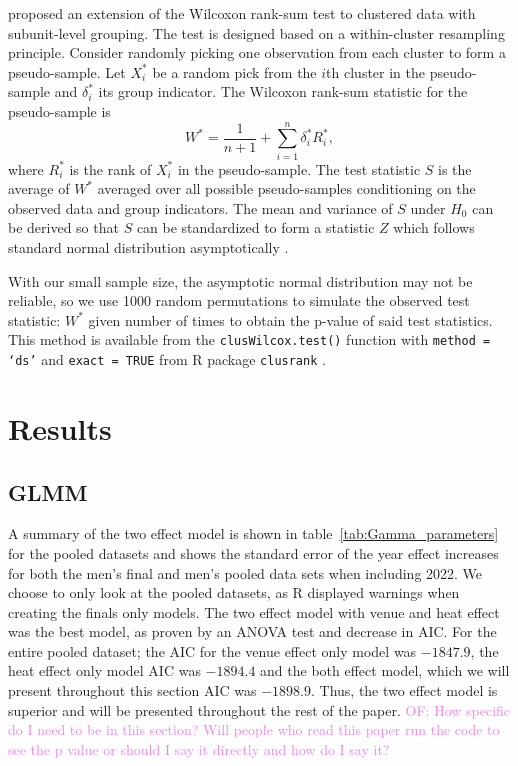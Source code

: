 \documentclass[12pt, letterpaper, titlepage]{article}
\newcommand{\of}[1]{\textcolor{violet}{OF: #1}}
\begin{document}
\citet{datta2005rank} proposed an extension of the Wilcoxon rank-sum test to
clustered data with subunit-level grouping. The test is designed based on a
within-cluster resampling principle. Consider randomly picking one observation
from each cluster to form a pseudo-sample. Let $X_i^*$ be a random pick from the
$i$th cluster in the pseudo-sample and $\delta_i^*$ its group indicator. The
Wilcoxon rank-sum statistic for the pseudo-sample is
\[
W^* = \frac{1}{n + 1} + \sum_{i=1}^{n} \delta_{i}^{*} R_{i}^{*},
\]
where $R_{i}^{*}$ is the rank of $X_{i}^{*}$ in the pseudo-sample.
The test statistic $S$ is the average of $W^*$ averaged over all possible
pseudo-samples conditioning on the observed data and group indicators.
The mean and variance of $S$ under $H_0$ can be derived so that $S$ can be
standardized to form a statistic $Z$ which follows standard normal distribution
asymptotically \citep[p.910]{datta2005rank}.


With our small sample size, the asymptotic normal distribution may not be
reliable, so we use 1000 random permutations to simulate the observed test 
statistic: $W^*$ given number of times to obtain the p-value of said test 
statistics. This method is available from the \texttt{clusWilcox.test()} function
with \texttt{method = `ds'} and \texttt{exact = TRUE} from R package
\texttt{clusrank} \citep{jiang2020wilcoxon}.  


\section{Results} \label{sec:Results}

\subsection{GLMM} \label{subsec:Results_GLMM}


A summary of the two effect model is shown in table~\ref{tab:Gamma_parameters}
for the pooled datasets and shows the standard error of the year
effect increases for both the men's final and men's pooled data sets when
including 2022. We choose to only look at the pooled datasets, as R displayed
warnings when creating the finals only models.  The two effect model with venue
and heat effect was the best model, as proven by an ANOVA test and decrease in
AIC.  For the entire pooled dataset; the AIC for the venue effect only model was
$-1847.9$, the heat effect only model AIC was $-1894.4$ and the both effect model,
which we will present throughout this section AIC was $-1898.9$. Thus, the two
effect model is superior and will be presented throughout the rest of the paper.
\of{How specific do I need to be in this section? Will people who read this paper
run the code to see the p value or should I say it directly and how do I say it?}
\end{document}
